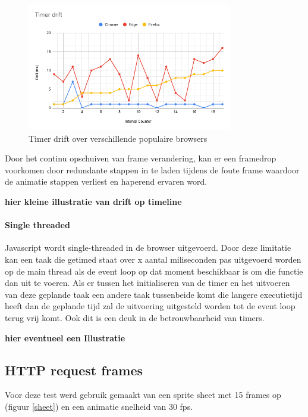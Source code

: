 \begin{figure}[H]
\centering
\includegraphics[width=0.8\textwidth]{img/Timer drift.png}
\caption{Timer drift over verschillende populaire browsers} \label{drift}
\end{figure}

Door het continu opschuiven van frame verandering, kan er een framedrop voorkomen door redundante stappen in te laden tijdens de foute frame waardoor de animatie stappen verliest en haperend ervaren word. 

\textbf{hier kleine illustratie van drift op timeline}

\paragraph{Single threaded}
Javascript wordt single-threaded in de browser uitgevoerd. Door deze limitatie kan een taak die getimed staat over x aantal miliseconden pas uitgevoerd worden op de main thread als de event loop op dat moment beschikbaar is om die functie dan uit te voeren. Als er tussen het initialiseren van de timer en het uitvoeren van deze geplande taak een andere taak tussenbeide komt die langere executietijd heeft dan de geplande tijd zal de uitvoering uitgesteld worden tot de event loop terug vrij komt. Ook dit is een deuk in de betrouwbaarheid van timers.

\textbf{hier eventueel een Illustratie}



\subsection{HTTP request frames}

Voor deze test werd gebruik gemaakt van een sprite sheet met 15 frames op (figuur \ref{sheet}) en een animatie snelheid van 30 fps.

